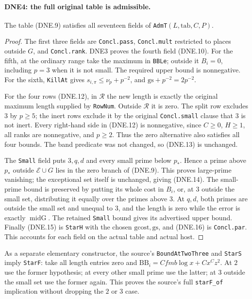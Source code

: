 \paragraph{DNE4: the full original table is admissible.}
\label{claim:DNE4}
The table (DNE.9) satisfies all seventeen fields of
\texttt{AdmT}$(L,\mathrm{tab},C,P)$.

\begin{proof}
The first three fields are \texttt{Concl.pass},
\texttt{Concl.mult} restricted to places outside $G$, and
\texttt{Concl.rank}.  DNE3 proves the fourth field (DNE.10).
For the fifth, at the ordinary range take the maximum in
\texttt{BBLe}; outside it $B_i=0$, including $p=3$ when it is not
small.  The required upper bound is nonnegative.  For the sixth,
\texttt{KillAt} gives $s_{i,\pi}\le\nu_p+p^{-2}$, and
$\mathrm{gs}+p^{-2}=2p^{-2}$.

For the four rows (DNE.12), in $\mathcal R$ the new length is
exactly the original maximum length supplied by \texttt{RowNum}.
Outside $\mathcal R$ it is zero.  The split row excludes $3$
by $p\ge5$; the inert rows exclude it by the original
\texttt{Concl.small} clause that $3$ is not inert.  Every
right-hand side in (DNE.12) is nonnegative, since $C\ge0$,
$H\ge1$, all ranks are nonnegative, and $p\ge2$.
Thus the zero alternative also satisfies all four bounds.
The band predicate was not changed, so (DNE.13) is unchanged.

The \texttt{Small} field puts $3,q,d$ and every small prime below
$p_*$.  Hence a prime above $p_*$ outside $\mathcal E\cup G$ lies
in the zero branch of (DNE.9).  This proves large-prime vanishing;
the exceptional set itself is unchanged, giving (DNE.14).
The small-prime bound is preserved by putting its whole cost in
$B_i$, or, at $3$ outside the small set, distributing it equally
over the primes above $3$.  At $q,d$, both primes are outside the
small set and unequal to $3$, and the length is zero while the
error is exactly $\operatorname{midG}$.  The retained
\texttt{Small} bound gives its advertised upper bound.
Finally (DNE.15) is \texttt{StarH} with the chosen
$\mathrm{gcost},\mathrm{gs}$, and (DNE.16) is
\texttt{Concl.par}.  This accounts for each field on the actual
table and actual host.
\end{proof}

As a separate elementary constructor, the source's
\texttt{BoundAtTwoThree} and \texttt{StarS} imply \texttt{StarF}:
take all length entries zero and $\mathrm{BB}_i=Cfm b\log x+Cx^Cz^2$.
At $2$ use the former hypothesis; at every other small prime use
the latter; at $3$ outside the small set use the former again.
This proves the source's full \texttt{starF\_of} implication
without dropping the $2$ or $3$ case.


